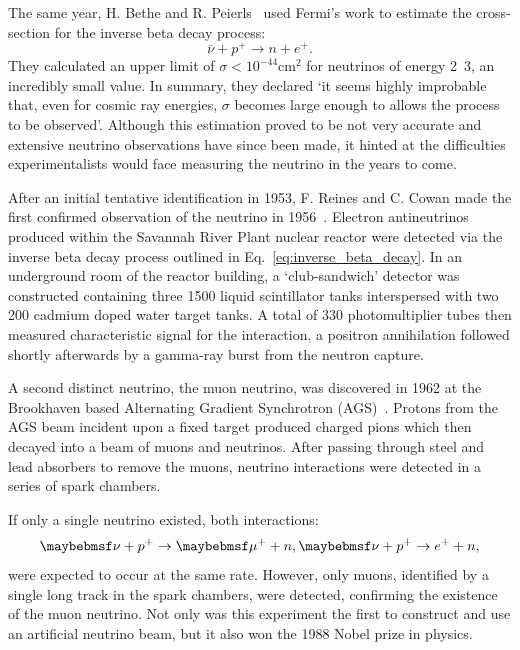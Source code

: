 The same year, H. Bethe and R. Peierls~\cite{bethe1934} used Fermi's work to estimate the
cross-section for the inverse beta decay process:
\begin{equation} %
    \bar{\nu} + p^{+} \rightarrow n + e^{+}.
    \label{eq:inverse_beta_decay}
\end{equation}
They calculated an upper limit of $\sigma<10^{-44} \mathrm{cm}^2$ for neutrinos of energy
\unit{2.3}{\MeV}, an incredibly small value. In summary, they declared `it seems highly improbable
that, even for cosmic ray energies, $\sigma$ becomes large enough to allows the process to be
observed'. Although this estimation proved to be not very accurate and extensive neutrino
observations have since been made, it hinted at the difficulties experimentalists would face
measuring the neutrino in the years to come.

After an initial tentative identification in 1953, F. Reines and C. Cowan made the first confirmed
observation of the neutrino in 1956~\cite{cowan1956}. Electron antineutrinos produced within the
Savannah River Plant nuclear reactor were detected via the inverse beta decay process outlined in
Eq.~\ref{eq:inverse_beta_decay}. In an underground room of the reactor building, a `club-sandwich'
detector was constructed containing three \unit{1500}{} liquid scintillator tanks
interspersed with two \unit{200}{} cadmium doped water target tanks. A total of 330
photomultiplier tubes then measured characteristic signal for the interaction, a positron
annihilation followed shortly afterwards by a gamma-ray burst from the neutron capture.

A second distinct neutrino, the muon neutrino, was discovered in 1962 at the Brookhaven based
Alternating Gradient Synchrotron (AGS)~\cite{danby1962}. Protons from the AGS beam incident upon a
fixed target produced charged pions which then decayed into a beam of muons and neutrinos. After
passing through steel and lead absorbers to remove the muons, neutrino interactions were detected
in a series of spark chambers.

If only a single neutrino existed, both interactions:
\begin{equation} %
    \nu+p^{+}\rightarrow\mu^{+}+n, \\
    \nu+p^{+}\rightarrow e^{+}+n,
\end{equation}
were expected to occur at the same rate. However, only muons, identified by a single long track in
the spark chambers, were detected, confirming the existence of the muon neutrino. Not only was this
experiment the first to construct and use an artificial neutrino beam, but it also won the 1988
Nobel prize in physics.

